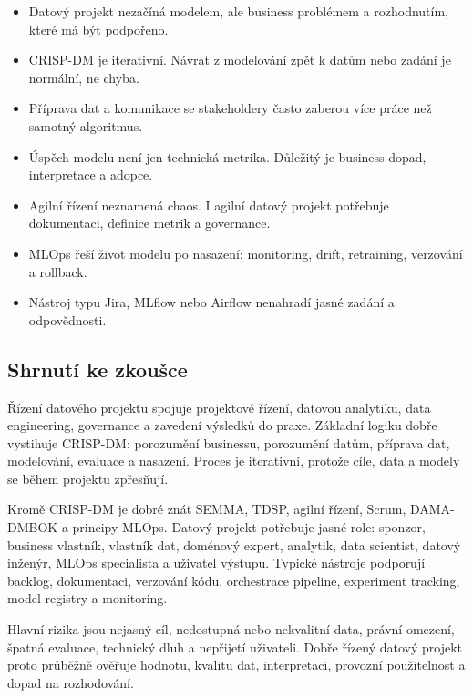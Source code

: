 \pozor
\begin{itemize}
  \item Datový projekt nezačíná modelem, ale business problémem a rozhodnutím, které má být podpořeno.
  \item CRISP-DM je iterativní. Návrat z modelování zpět k datům nebo zadání je normální, ne chyba.
  \item Příprava dat a komunikace se stakeholdery často zaberou více práce než samotný algoritmus.
  \item Úspěch modelu není jen technická metrika. Důležitý je business dopad, interpretace a adopce.
  \item Agilní řízení neznamená chaos. I agilní datový projekt potřebuje dokumentaci, definice metrik a governance.
  \item MLOps řeší život modelu po nasazení: monitoring, drift, retraining, verzování a rollback.
  \item Nástroj typu Jira, MLflow nebo Airflow nenahradí jasné zadání a odpovědnosti.
\end{itemize}

\subsection{Shrnutí ke zkoušce}
Řízení datového projektu spojuje projektové řízení, datovou analytiku, data engineering, governance a zavedení výsledků do praxe. Základní logiku dobře vystihuje CRISP-DM: porozumění businessu, porozumění datům, příprava dat, modelování, evaluace a nasazení. Proces je iterativní, protože cíle, data a modely se během projektu zpřesňují.

Kromě CRISP-DM je dobré znát SEMMA, TDSP, agilní řízení, Scrum, DAMA-DMBOK a principy MLOps. Datový projekt potřebuje jasné role: sponzor, business vlastník, vlastník dat, doménový expert, analytik, data scientist, datový inženýr, MLOps specialista a uživatel výstupu. Typické nástroje podporují backlog, dokumentaci, verzování kódu, orchestrace pipeline, experiment tracking, model registry a monitoring.

Hlavní rizika jsou nejasný cíl, nedostupná nebo nekvalitní data, právní omezení, špatná evaluace, technický dluh a nepřijetí uživateli. Dobře řízený datový projekt proto průběžně ověřuje hodnotu, kvalitu dat, interpretaci, provozní použitelnost a dopad na rozhodování.

